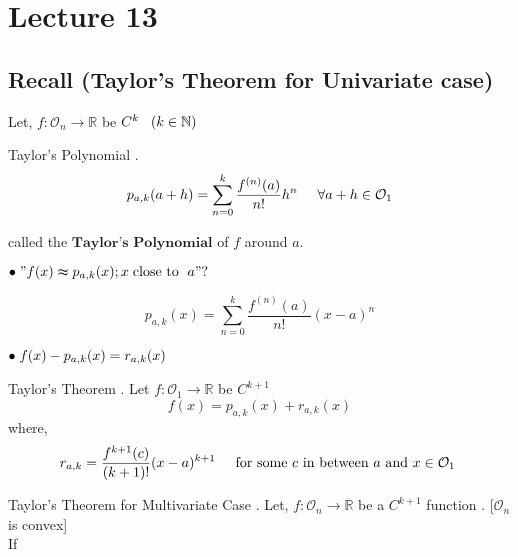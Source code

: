 \documentclass[Analysis-3]{subfiles}
\begin{document}
\chapter*{Lecture 13} %
\setcounter{chapter}{13} %
\setcounter{section}{0}

\section{Recall (Taylor's Theorem for Univariate case)}


Let, $f : \mathcal{O}_n \to \mathbb{R} $ be $C^k \hspace{3mm} (k \in \mathbb{N})$ 

\begin{Def}{Taylor's Polynomial}
    . \[ p_{a,k}(a+h) = \sum_{n = 0}^{k} \frac{f^{(n)}(a)}{n!} h^{n} \hspace{5mm} \forall a+h \in \mathcal{O}_1 \]

    called the $\textbf{Taylor's Polynomial}$ of $f$ around $a$.
\end{Def}

$\bullet \hspace{1mm} "f(x) \thickapprox  p_{a,k}(x) ; x \hspace{1mm} \text{close to } \hspace{1mm} a" ? $ 

\[ p_{a,k}(x) = \sum_{n = 0}^{k} \frac{f^{(n)}(a)}{n!} (x-a)^{n} \]

$\bullet \hspace{1mm} f(x) - p_{a,k}(x) = r_{a,k} (x)$

\begin{Thm}{Taylor's Theorem}
    . Let $f: \mathcal{O}_1 \to \mathbb{R} $ be $C^{k+1}$ 
    \[ f(x) = p_{a,k}(x) + r_{a,k}(x) \]
   where, \[r_{a,k} = \frac{f^{k+1}(c)}{(k+1)!} (x-a)^{k+1} \hspace{5mm} \text{for some $c$ in between $a$ and $x \in \mathcal{O}_1$ }\]
\end{Thm}

\begin{Thm}{Taylor's Theorem for Multivariate Case}
    . Let, $f: \mathcal{O}_n \to \mathbb{R} $ be a $C^{k+1}$ function . [$\mathcal{O}_n$ is convex] \\

If 

\end{Thm}
\end{document}
